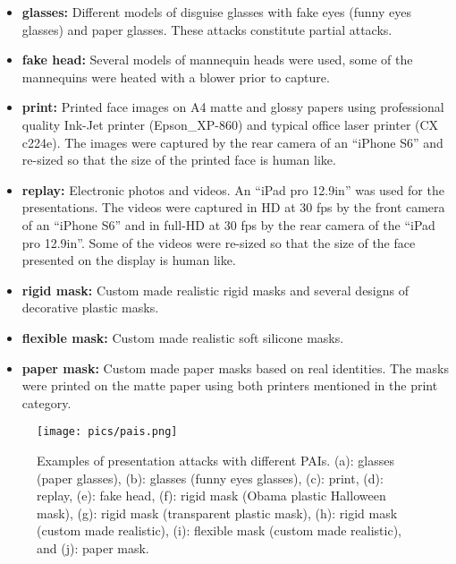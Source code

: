 \documentclass[journal]{IEEEtran}
\begin{document}
\begin{itemize}
\item \textbf{glasses:} Different models of disguise glasses with fake eyes (funny eyes glasses) and paper glasses. These attacks constitute partial attacks.

\item \textbf{fake head:} Several models of mannequin heads were used, some of the mannequins were heated with a blower prior to capture.

\item \textbf{print:}  Printed face images on A4 matte and glossy papers using professional quality Ink-Jet printer (Epson\_XP-860) and typical office laser printer (CX c224e). The images were captured by the rear camera of an ``iPhone S6'' and re-sized so that the size of the printed face is human like.

\item \textbf{replay:} Electronic photos and videos. An ``iPad pro 12.9in'' was used for the presentations. The videos were captured in HD at 30 fps by the front camera of an ``iPhone S6'' and in full-HD at 30 fps by the rear camera of the ``iPad pro 12.9in''. Some of the videos were re-sized so that the size of the face presented on the display is human like.

\item \textbf{rigid mask:} Custom made realistic rigid masks and several designs of decorative plastic masks.

\item \textbf{flexible mask:} Custom made realistic soft silicone masks.

\item \textbf{paper mask:} Custom made paper masks based on real identities. The masks were printed on the matte paper using both printers mentioned in the print category.

\end{itemize}


\begin{figure}[ht]
    \centering
    \texttt{[image: pics/pais.png]}
    \caption{Examples of presentation attacks with different PAIs. (a): glasses (paper glasses), (b): glasses (funny eyes glasses), (c): print, (d): replay, (e): fake head, (f): rigid mask (Obama plastic Halloween mask), (g): rigid mask (transparent plastic mask), (h): rigid mask (custom made realistic), (i): flexible mask (custom made realistic), and (j): paper mask.}
    \label{fig:pais}
\end{figure}
\end{document}
